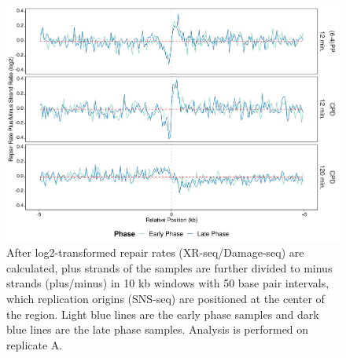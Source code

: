 \begin{figure}[H]
\begin{center}
\includegraphics[width=\textwidth]{Chapters/7_appendix/figures/supfig58}
\caption[Repair rate plus/minus ratio of replication origins in 10 kb (replicate A).]{After log2-transformed repair rates (XR-seq/Damage-seq) are calculated, plus strands of the samples are further divided to minus strands (plus/minus) in 10 kb windows with 50 base pair intervals, which replication origins (SNS-seq) are positioned at the center of the region. Light blue lines are the early phase samples and dark blue lines are the late phase samples. Analysis is performed on replicate A.}
\label{supfig:rrpm10snsA}
\end{center}
\end{figure}

